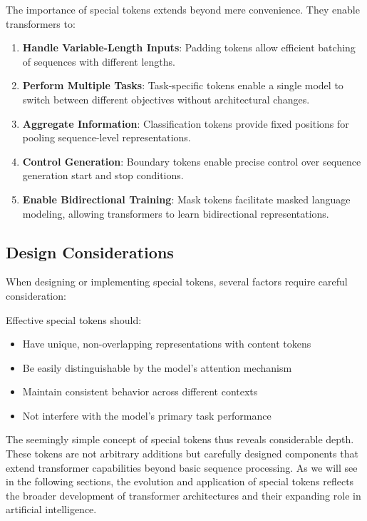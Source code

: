 The importance of special tokens extends beyond mere convenience. They enable transformers to:

\begin{enumerate}
\item \textbf{Handle Variable-Length Inputs}: Padding tokens allow efficient batching of sequences with different lengths.

\item \textbf{Perform Multiple Tasks}: Task-specific tokens enable a single model to switch between different objectives without architectural changes.

\item \textbf{Aggregate Information}: Classification tokens provide fixed positions for pooling sequence-level representations.

\item \textbf{Control Generation}: Boundary tokens enable precise control over sequence generation start and stop conditions.

\item \textbf{Enable Bidirectional Training}: Mask tokens facilitate masked language modeling, allowing transformers to learn bidirectional representations.
\end{enumerate}

\subsection{Design Considerations}

When designing or implementing special tokens, several factors require careful consideration:

\begin{principle}
Effective special tokens should:
\begin{itemize}
\item Have unique, non-overlapping representations with content tokens
\item Be easily distinguishable by the model's attention mechanism
\item Maintain consistent behavior across different contexts
\item Not interfere with the model's primary task performance
\end{itemize}
\end{principle}

The seemingly simple concept of special tokens thus reveals considerable depth. These tokens are not arbitrary additions but carefully designed components that extend transformer capabilities beyond basic sequence processing. As we will see in the following sections, the evolution and application of special tokens reflects the broader development of transformer architectures and their expanding role in artificial intelligence.
